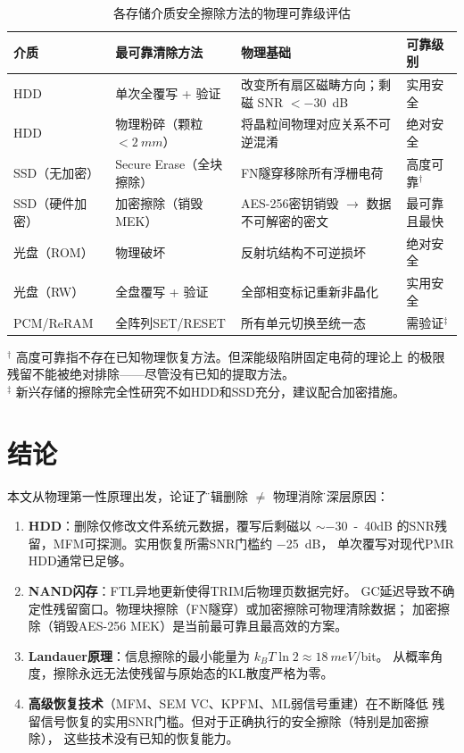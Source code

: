\documentclass[11pt,a4paper,twoside]{article}
\theoremstyle{definition}\newtheorem{definition}{定义}[section]
\theoremstyle{plain}\newtheorem{theorem}{定理}[section]
\theoremstyle{remark}\newtheorem{remark}{注解}[section]
\begin{document}
\begin{table}[H]
\centering\caption{各存储介质安全擦除方法的物理可靠级评估}
\begin{tabular}{@{}p{3cm}p{4cm}p{4.5cm}p{2.5cm}@{}}
\toprule
介质 & 最可靠清除方法 & 物理基础 & 可靠级别 \\
\midrule
HDD & 单次全覆写 + 验证 & 改变所有扇区磁畴方向；剩磁 SNR $<$\SI{-30}{dB} & 实用安全 \\
HDD & 物理粉碎（颗粒 $< \SI{2}{mm}$） & 将晶粒间物理对应关系不可逆混淆 & 绝对安全 \\
SSD（无加密） & Secure Erase（全块擦除） & FN隧穿移除所有浮栅电荷 & 高度可靠$^\dagger$ \\
SSD（硬件加密） & 加密擦除（销毁MEK） & AES-256密钥销毁 $\to$ 数据不可解密的密文 & 最可靠且最快 \\
光盘（ROM） & 物理破坏 & 反射坑结构不可逆损坏 & 绝对安全 \\
光盘（RW） & 全盘覆写 + 验证 & 全部相变标记重新非晶化 & 实用安全 \\
PCM/ReRAM & 全阵列SET/RESET & 所有单元切换至统一态 & 需验证$^\ddagger$ \\
\bottomrule
\end{tabular}

\vspace{4pt}
{\footnotesize
$^\dagger$ 高度可靠指不存在已知物理恢复方法。但深能级陷阱固定电荷的理论上
的极限残留不能被绝对排除——尽管没有已知的提取方法。\\
$^\ddagger$ 新兴存储的擦除完全性研究不如HDD和SSD充分，建议配合加密措施。
}
\end{table}

\section{结论}

本文从物理第一性原理出发，论证了\"逻辑删除 $\neq$ 物理消除\"的深层原因：

\begin{enumerate}
  \item \textbf{HDD}：删除仅修改文件系统元数据，覆写后剩磁以 $\sim$\SI{-30}{-40}{dB}
  的SNR残留，MFM可探测。实用恢复所需SNR门槛约 \SI{-25}{dB}，
  单次覆写对现代PMR HDD通常已足够。

  \item \textbf{NAND闪存}：FTL异地更新使得TRIM后物理页数据完好。
  GC延迟导致不确定性残留窗口。物理块擦除（FN隧穿）或加密擦除可物理清除数据；
  加密擦除（销毁AES-256 MEK）是当前最可靠且最高效的方案。

  \item \textbf{Landauer原理}：信息擦除的最小能量为 $k_B T \ln 2 \approx \SI{18}{meV}$/bit。
  从概率角度，擦除永远无法使残留与原始态的KL散度严格为零。

  \item \textbf{高级恢复技术}（MFM、SEM VC、KPFM、ML弱信号重建）在不断降低
  残留信号恢复的实用SNR门槛。但对于正确执行的安全擦除（特别是加密擦除），
  这些技术没有已知的恢复能力。
\end{enumerate}
\end{document}
